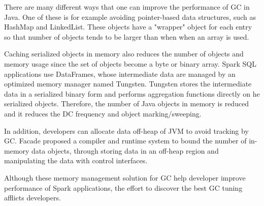 There are many different ways that one can improve the performance of GC in Java. One of these is for example avoiding pointer-based data structures, such as HashMap and LinkedList. 
These objects have a "wrapper" object for each entry so that number of objects tends to be larger than when when an array is used.

Caching serialized objects in memory also reduces the number of objects and memory usage since the set of objects become a byte or binary array. 
Spark SQL applications use DataFrames\cite{DBLP:conf/sigmod/ArmbrustXLHLBMK15}, 
whose intermediate data are managed by an optimized memory manager named Tungsten.
Tungsten stores the intermediate data in a serialized binary form and performs aggregation functions directly on he serialized objects.
Therefore, the number of Java objects in memory is reduced and it reduces the DC frequency and object marking/sweeping. 

In addition, developers can allocate data off-heap of JVM to avoid tracking by GC. 
Facade\cite{DBLP:conf/asplos/NguyenWBFHX15} proposed a compiler and runtime system to bound the number of in-memory data objects, through storing data in an off-heap region and 
manipulating the data with control interfaces.

Although these memory management solution for GC help developer improve performance of Spark applications, 
the effort to discover the best GC tuning afflicts developers.